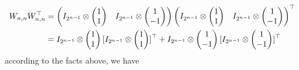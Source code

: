 \documentclass[12pt]{article}
\begin{document}
\begin{align*}
W_{n, n} \transpos{W_{n, n}} &= 
\begin{pmatrix}
I_{2^{n-1}} \tensor 
\begin{pmatrix}
1 \\
1
\end{pmatrix}
& 
I_{2^{n-1}} \tensor 
\begin{pmatrix}
1 \\
-1
\end{pmatrix}
\end{pmatrix}
\transpos{
\begin{pmatrix}
I_{2^{n-1}} \tensor 
\begin{pmatrix}
1 \\
1
\end{pmatrix}
& 
I_{2^{n-1}} \tensor 
\begin{pmatrix}
1 \\
-1
\end{pmatrix}
\end{pmatrix}} \\
&=
I_{2^{n-1}} \tensor 
\begin{pmatrix}
1 \\
1
\end{pmatrix}
\transpos{[
I_{2^{n-1}} \tensor 
\begin{pmatrix}
1 \\
1
\end{pmatrix}
]} + 
I_{2^{n-1}} \tensor 
\begin{pmatrix}
1 \\
-1
\end{pmatrix}
\transpos{[
I_{2^{n-1}} \tensor 
\begin{pmatrix}
1 \\
-1
\end{pmatrix}]
} \\
\end{align*}
according to the facts above, we have
\end{document}
